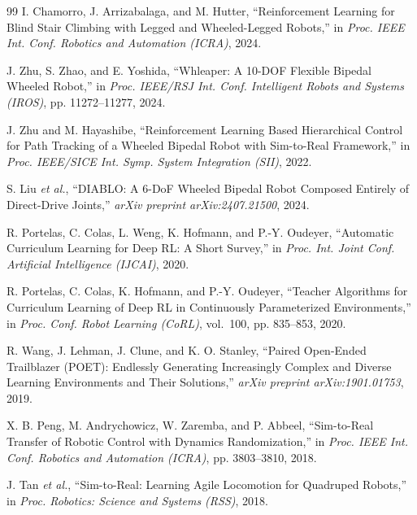 \documentclass[conference]{IEEEtran}
\begin{document}
\begin{thebibliography}{99}
I. Chamorro, J. Arrizabalaga, and M. Hutter,
``Reinforcement Learning for Blind Stair Climbing with Legged and Wheeled-Legged Robots,''
in \emph{Proc. IEEE Int. Conf. Robotics and Automation (ICRA)}, 2024.

J. Zhu, S. Zhao, and E. Yoshida,
``Whleaper: A 10-DOF Flexible Bipedal Wheeled Robot,''
in \emph{Proc. IEEE/RSJ Int. Conf. Intelligent Robots and Systems (IROS)},
pp. 11272--11277, 2024.

J. Zhu and M. Hayashibe,
``Reinforcement Learning Based Hierarchical Control for Path Tracking of a
Wheeled Bipedal Robot with Sim-to-Real Framework,''
in \emph{Proc. IEEE/SICE Int. Symp. System Integration (SII)}, 2022.

S. Liu \emph{et al.},
``DIABLO: A 6-DoF Wheeled Bipedal Robot Composed Entirely of Direct-Drive Joints,''
\emph{arXiv preprint arXiv:2407.21500}, 2024.

R. Portelas, C. Colas, L. Weng, K. Hofmann, and P.-Y. Oudeyer,
``Automatic Curriculum Learning for Deep RL: A Short Survey,''
in \emph{Proc. Int. Joint Conf. Artificial Intelligence (IJCAI)}, 2020.

R. Portelas, C. Colas, K. Hofmann, and P.-Y. Oudeyer,
``Teacher Algorithms for Curriculum Learning of Deep RL in Continuously
Parameterized Environments,''
in \emph{Proc. Conf. Robot Learning (CoRL)}, vol.~100, pp. 835--853, 2020.

R. Wang, J. Lehman, J. Clune, and K. O. Stanley,
``Paired Open-Ended Trailblazer (POET): Endlessly Generating Increasingly
Complex and Diverse Learning Environments and Their Solutions,''
\emph{arXiv preprint arXiv:1901.01753}, 2019.

X. B. Peng, M. Andrychowicz, W. Zaremba, and P. Abbeel,
``Sim-to-Real Transfer of Robotic Control with Dynamics Randomization,''
in \emph{Proc. IEEE Int. Conf. Robotics and Automation (ICRA)},
pp. 3803--3810, 2018.

J. Tan \emph{et al.},
``Sim-to-Real: Learning Agile Locomotion for Quadruped Robots,''
in \emph{Proc. Robotics: Science and Systems (RSS)}, 2018.

\end{thebibliography}
\end{document}

